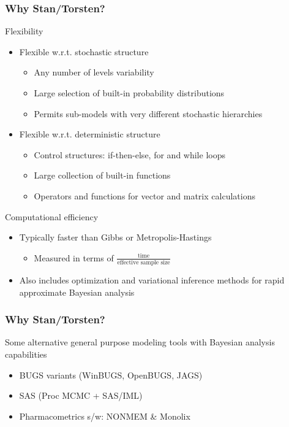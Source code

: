 \documentclass{beamer}
\begin{document}
\begin{frame}
  \frametitle{Why Stan/Torsten?}
  
  Flexibility
  \begin{itemize}
  \item<1-> Flexible w.r.t. stochastic structure
    \begin{itemize}
    \item Any number of levels variability
    \item Large selection of built-in probability distributions
    \item Permits sub-models with very different stochastic
      hierarchies
    \end{itemize}
  \item<2-> Flexible w.r.t. deterministic structure
    \begin{itemize}
    \item Control structures: if-then-else, for and while loops
    \item Large collection of built-in functions
    \item Operators and functions for vector and matrix calculations
    \end{itemize}
  \end{itemize}
  Computational efficiency
  \begin{itemize}
  \item<3-> Typically faster than Gibbs or Metropolis-Hastings
    \begin{itemize}
    \item Measured in terms of
      $\frac{\text{time}}{\text{effective sample size}}$
    \end{itemize}
  \item<4-> Also includes optimization and variational inference methods
    for rapid approximate Bayesian analysis
  \end{itemize}

\end{frame}

\begin{frame}
  \frametitle{Why Stan/Torsten?}

Some alternative general purpose modeling tools with
        Bayesian analysis capabilities
        \begin{itemize}
        \item BUGS variants (WinBUGS, OpenBUGS, JAGS)
        \item SAS (Proc MCMC + SAS/IML)
        \item Pharmacometrics s/w: NONMEM \& Monolix
      \end{itemize}

\end{frame}
\end{document}
